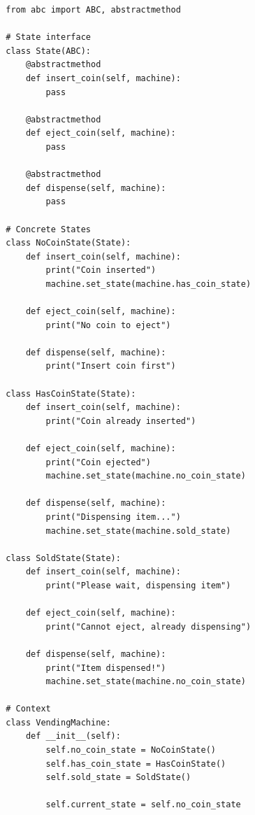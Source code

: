     \begin{example}
      \label{ex:coin-machine}
      \begin{lstlisting}
        from abc import ABC, abstractmethod

        # State interface
        class State(ABC):
            @abstractmethod
            def insert_coin(self, machine):
                pass
            
            @abstractmethod
            def eject_coin(self, machine):
                pass
            
            @abstractmethod
            def dispense(self, machine):
                pass

        # Concrete States
        class NoCoinState(State):
            def insert_coin(self, machine):
                print("Coin inserted")
                machine.set_state(machine.has_coin_state)
            
            def eject_coin(self, machine):
                print("No coin to eject")
            
            def dispense(self, machine):
                print("Insert coin first")

        class HasCoinState(State):
            def insert_coin(self, machine):
                print("Coin already inserted")
            
            def eject_coin(self, machine):
                print("Coin ejected")
                machine.set_state(machine.no_coin_state)
            
            def dispense(self, machine):
                print("Dispensing item...")
                machine.set_state(machine.sold_state)

        class SoldState(State):
            def insert_coin(self, machine):
                print("Please wait, dispensing item")
            
            def eject_coin(self, machine):
                print("Cannot eject, already dispensing")
            
            def dispense(self, machine):
                print("Item dispensed!")
                machine.set_state(machine.no_coin_state)

        # Context
        class VendingMachine:
            def __init__(self):
                self.no_coin_state = NoCoinState()
                self.has_coin_state = HasCoinState()
                self.sold_state = SoldState()
                
                self.current_state = self.no_coin_state
            

\end{lstlisting}
\end{example}
